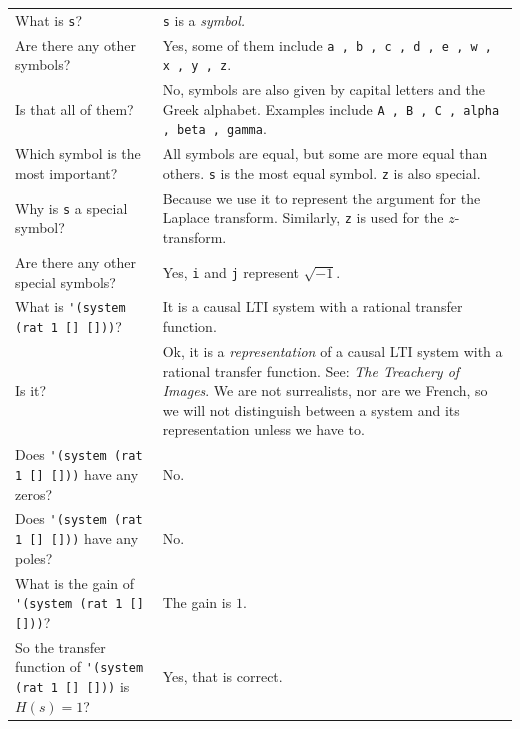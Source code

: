 \documentclass[11pt,letter]{article}
\begin{document}
\begin{longtable}{ p{} p{} }
  \toprule
  \toprule
  What is \lstinline!s!?
  &
  \lstinline!s! is a \emph{symbol.} \\

  Are there any other symbols?
  &
  Yes, some of them include \lstinline!a , b , c , d , e , w , x , y , z!. \\

  Is that all of them?
  &
  No, symbols are also given by capital letters and the Greek alphabet. Examples include \lstinline!A , B , C , alpha , beta , gamma!. \\

  Which symbol is the most important?
  &
  All symbols are equal, but some are more equal than others. \lstinline!s! is the most equal symbol. \lstinline!z! is also special. \\

  Why is \lstinline!s! a special symbol?
  &
  Because we use it to represent the argument for the Laplace transform. Similarly, \lstinline!z! is used for the $z$-transform. \\

  Are there any other special symbols?
  &
  Yes, \lstinline!i! and \lstinline!j! represent $\sqrt{-1}$. \\

  \midrule
  \midrule
  What is \lstinline!'(system (rat 1 [] []))!?
  &
  It is a causal LTI system with a rational transfer function. \\

  Is it?
  &
  Ok, it is a \emph{representation} of a causal LTI system with a rational transfer function.
  See: \emph{The Treachery of Images}.
  We are not surrealists, nor are we French, so we will not distinguish between a system and its representation unless we have to. \\

  Does \lstinline!'(system (rat 1 [] []))! have any zeros?
  &
  No. \\

  Does \lstinline!'(system (rat 1 [] []))! have any poles?
  &
  No. \\

  What is the gain of \lstinline!'(system (rat 1 [] []))!?
  &
  The gain is $1$. \\

  So the transfer function of \lstinline!'(system (rat 1 [] []))! is $H(s)=1$?
  &
  Yes, that is correct. \\


\end{longtable}
\end{document}
